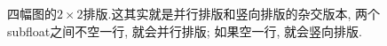 \documentclass[10pt,a4paper,twocolumn,twoside,UTF8]{ctexart}
\begin{document}
	\begin{figure}[htbp]
		\centering

		\caption{四幅图的$2\times 2$排版.这其实就是并行排版和竖向排版的杂交版本, 两个subfloat之间不空一行, 就会并行排版; 如果空一行, 就会竖向排版.}
	\end{figure}
\end{document}
